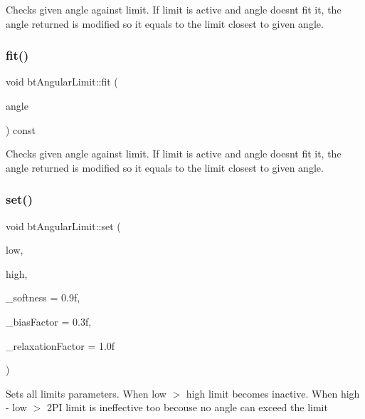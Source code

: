 Checks given angle against limit. If limit is active and angle doesn\textquotesingle{}t fit it, the angle returned is modified so it equals to the limit closest to given angle. \mbox{\label{classbtAngularLimit_aba82fc7d176c0b4e483eb3959f84eb65}} 
\subsubsection{\texorpdfstring{fit()}{fit()}\hspace{0.1cm}{\footnotesize\ttfamily [2/2]}}
{\footnotesize\ttfamily void bt\+Angular\+Limit\+::fit (\begin{DoxyParamCaption}\item[{bt\+Scalar \&}]{angle }\end{DoxyParamCaption}) const}

Checks given angle against limit. If limit is active and angle doesn\textquotesingle{}t fit it, the angle returned is modified so it equals to the limit closest to given angle. \mbox{\label{classbtAngularLimit_aae9e0c21886c2f98f9ad1928bf024b3f}} 
\subsubsection{\texorpdfstring{set()}{set()}\hspace{0.1cm}{\footnotesize\ttfamily [1/2]}}
{\footnotesize\ttfamily void bt\+Angular\+Limit\+::set (\begin{DoxyParamCaption}\item[{bt\+Scalar}]{low,  }\item[{bt\+Scalar}]{high,  }\item[{bt\+Scalar}]{\+\_\+softness = {\ttfamily 0.9f},  }\item[{bt\+Scalar}]{\+\_\+bias\+Factor = {\ttfamily 0.3f},  }\item[{bt\+Scalar}]{\+\_\+relaxation\+Factor = {\ttfamily 1.0f} }\end{DoxyParamCaption})}

Sets all limit\textquotesingle{}s parameters. When low $>$ high limit becomes inactive. When high -\/ low $>$ 2\+PI limit is ineffective too becouse no angle can exceed the limit \mbox{\label{classbtAngularLimit_aae9e0c21886c2f98f9ad1928bf024b3f}} 
